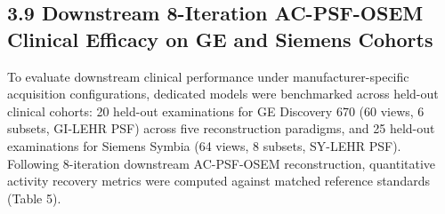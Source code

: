 \documentclass[11pt]{article}
\begin{document}
\subsection*{3.9 Downstream 8-Iteration AC-PSF-OSEM Clinical Efficacy on GE and Siemens Cohorts}
To evaluate downstream clinical performance under manufacturer-specific acquisition configurations, dedicated models were benchmarked across held-out clinical cohorts: 20 held-out examinations for GE Discovery 670 (60 views, 6 subsets, GI-LEHR PSF) across five reconstruction paradigms, and 25 held-out examinations for Siemens Symbia (64 views, 8 subsets, SY-LEHR PSF). Following 8-iteration downstream AC-PSF-OSEM reconstruction, quantitative activity recovery metrics were computed against matched reference standards (Table 5).\par
\end{document}
